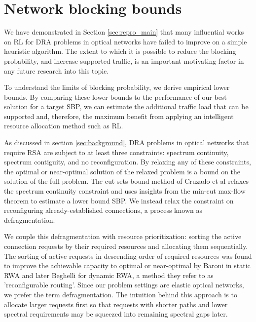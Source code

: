 \section{Network blocking bounds}
\label{sec:bounds}

We have demonstrated in Section \ref{sec:repro_main} that many influential works on RL for DRA problems in optical networks have failed to improve on a simple heuristic algorithm. The extent to which it is possible to reduce the blocking probability, and increase supported traffic, is an important motivating factor in any future research into this topic. 

To understand the limits of blocking probability, we derive empirical lower bounds. By comparing these lower bounds to the performance of our best solution for a target SBP, we can estimate the additional traffic load that can be supported and, therefore, the maximum benefit from applying an intelligent resource allocation method such as RL. %

As discussed in section \ref{sec:background}, DRA problems in optical networks that require RSA are subject to at least three constraints: spectrum continuity, spectrum contiguity, and no reconfiguration. By relaxing any of these constraints, the optimal or near-optimal solution of the relaxed problem is a bound on the solution of the full problem. The cut-sets bound method of Cruzado et al \cite{cruzado_effective_2023,cruzado_capacity-bound_2024} relaxes the spectrum continuity constraint and uses insights from the min-cut max-flow theorem to estimate a lower bound SBP. We instead relax the constraint on reconfiguring already-established connections, a process known as defragmentation.

We couple this defragmentation with resource prioritization: sorting the active connection requests by their required resources and allocating them sequentially. The sorting of active requests in descending order of required resources was found to improve the achievable capacity to optimal or near-optimal by Baroni \cite{baroni_routing_1998} in static RWA and later Beghelli \cite{beghelli_resource_2006} for dynamic RWA, a method they refer to as 'reconfigurable routing'. Since our problem settings are elastic optical networks, we prefer the term defragmentation. The intuition behind this approach is to allocate larger requests first so that requests with shorter paths and lower spectral requirements may be squeezed into remaining spectral gaps later.







